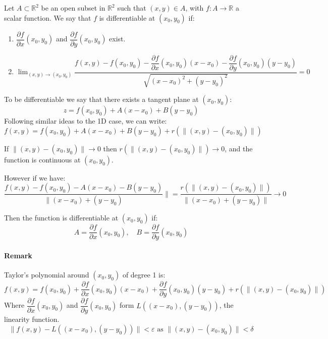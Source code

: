 \documentclass[11pt]{article}
\begin{document}
\begin{center}
\end{center}

Let $A \subset \mathbb{R}^2$ be an open subset in $\mathbb{R}^2$ such that $(x,y) \in A$, with $f : A \rightarrow \mathbb{R}$ a scalar function. We say that $f$ is differentiable at $(x_0, y_0)$ if: 
\begin{enumerate}
    \item $\dfrac{\partial f}{\partial x}(x_0, y_0)$ and $\dfrac{\partial f}{\partial y}(x_0, y_0)$ exist.
    \item $\lim_{(x,y) \to (x_0, y_0)} \dfrac{f(x,y) - f(x_0, y_0) - \dfrac{\partial f}{\partial x}(x_0, y_0)(x - x_0) - \dfrac{\partial f}{\partial y}(x_0, y_0)(y - y_0)}{\sqrt{(x - x_0)^2 + (y - y_0)^2}} = 0$
\end{enumerate}

To be differentiable we say that there exists a tangent plane at $(x_0, y_0)$:
\[
z = f(x_0, y_0) + A(x - x_0) + B(y - y_0)
\]
Following similar ideas to the 1D case, we can write:
\[
f(x,y) = f(x_0, y_0) + A(x - x_0) + B(y - y_0) + r(\|(x, y) - (x_0,y_0)\|)
\]

If $\|(x, y) - (x_0,y_0)\| \to 0$ then $r(\|(x, y) - (x_0,y_0)\|) \to 0$, and the function is continuous at $(x_0, y_0)$.

However if we have:
\[
\frac{f(x,y) - f(x_0, y_0) - A(x - x_0) - B(y - y_0)}{\|(x - x_0) + (y - y_0)}\| = \frac{r(\|(x, y) - (x_0,y_0)\|)}{\|(x - x_0) + (y - y_0)\|} \to 0
\]

Then the function is differentiable at $(x_0, y_0)$ if:
\[
A = \frac{\partial f}{\partial x}(x_0, y_0), \quad B = \frac{\partial f}{\partial y}(x_0, y_0)
\]

\paragraph{Remark}
Taylor's polynomial around $(x_0, y_0)$ of degree 1 is:
\[
f(x,y) = f(x_0, y_0) + \frac{\partial f}{\partial x}(x_0, y_0)(x - x_0) + \frac{\partial f}{\partial y}(x_0, y_0)(y - y_0) + r(\|(x, y) - (x_0,y_0)\|)
\]
Where $\dfrac{\partial f}{\partial x}(x_0, y_0)$ and $\dfrac{\partial f}{\partial y}(x_0, y_0)$ form $L\left((x - x_0), (y - y_0)\right)$, the linearity function.
\[
\|f(x,y) - L\left((x - x_0), (y - y_0)\right)\| < \varepsilon \text{ as } \|(x, y) - (x_0, y_0)\| < \delta
\]
\end{document}
